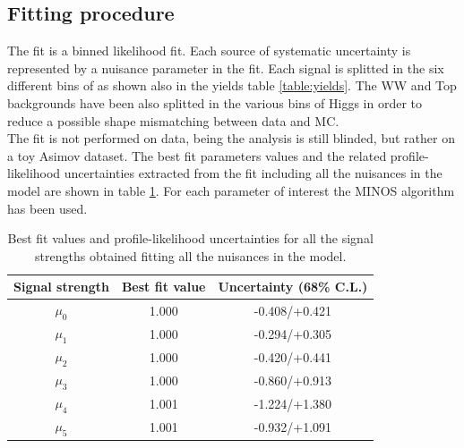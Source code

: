 \subsection{Fitting procedure}\label{subsec:fit}
The fit is a binned likelihood fit. Each source of systematic uncertainty is represented by a nuisance parameter in the fit.
Each signal is splitted in the six different bins of \pth as shown also in the yields table \ref{table:yields}. The WW and Top backgrounds have been also splitted in the various bins of Higgs \pt in order to reduce a possible shape mismatching between data and MC.\\
The fit is not performed on data, being the analysis is still blinded, but rather on a toy Asimov dataset. The best fit parameters values and the related profile-likelihood uncertainties extracted from the fit including all the nuisances in the model are shown in table \ref{table:fit_full}. For each parameter of interest the MINOS algorithm has been used.

\begin{table}
\centering
\caption{Best fit values and profile-likelihood uncertainties for all the signal strengths obtained fitting all the nuisances in the model.}\label{table:fit_full}
\begin{tabular}{c|c|c}
\hline
Signal strength & Best fit value & Uncertainty (68\% C.L.)\\
\hline\hline
$\mu_0$ & 1.000 & -0.408/+0.421 \\
$\mu_1$ & 1.000 & -0.294/+0.305 \\
$\mu_2$ & 1.000 & -0.420/+0.441 \\
$\mu_3$ & 1.000 & -0.860/+0.913 \\
$\mu_4$ & 1.001 & -1.224/+1.380 \\
$\mu_5$ & 1.001 & -0.932/+1.091 \\
\hline
\end{tabular}
\end{table}

